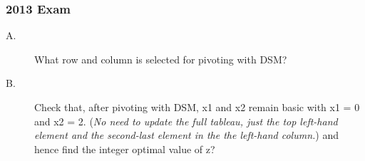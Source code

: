 \documentclass{beamer}
\begin{document}
\begin{frame}
\frametitle{2013 Exam}
\large
\begin{description}
\item[A.] What row and column is selected for pivoting with DSM? 
\item[B.] Check that, after pivoting with DSM, x1 and x2 remain basic
with x1 = 0 and x2 = 2. (\textit{No need to update the full tableau,
just the top left-hand element and the second-last element in
the the left-hand column.}) and hence find the integer optimal
value of z? 
\end{description}
\end{frame}
\end{document}

